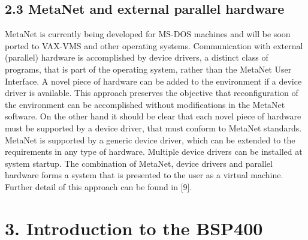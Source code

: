 \documentclass[11pt, a4paper]{article}
\begin{document}
\subsection*{\color{navyaccent} 2.3 MetaNet and external parallel hardware}

MetaNet is currently being developed for MS-DOS machines and will be soon ported to VAX-VMS and other operating systems. Communication with external (parallel) hardware is accomplished by device drivers, a distinct class of programs, that is part of the operating system, rather than the MetaNet User Interface. A novel piece of hardware can be added to the environment if a device driver is available. This approach preserves the objective that reconfiguration of the environment can be accomplished without modifications in the MetaNet software. On the other hand it should be clear that each novel piece of hardware must be supported by a device driver, that must conform to MetaNet standards. MetaNet is supported by a generic device driver, which can be extended to the requirements in any type of hardware. Multiple device drivers can be installed at system startup. The combination of MetaNet, device drivers and parallel hardware forms a system that is presented to the user as a virtual machine. Further detail of this approach can be found in [9].

\section*{\color{navyaccent} 3. Introduction to the BSP400}
\end{document}
